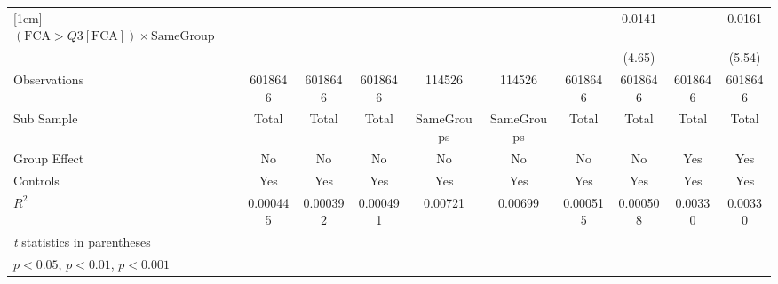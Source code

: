 {\begin{tabular}{l*{9}{c}}
[1em]
 $ (\text{FCA} > Q3[\text{FCA}]) \times  {\text{SameGroup} }  $ &                  &                  &                  &                  &                  &                  &   0.0141\sym{***}&                  &   0.0161\sym{***}\\
                &                  &                  &                  &                  &                  &                  &   (4.65)         &                  &   (5.54)         \\
\hline
Observations    &  6018646         &  6018646         &  6018646         &   114526         &   114526         &  6018646         &  6018646         &  6018646         &  6018646         \\
Sub Sample      &    Total         &    Total         &    Total         &SameGroups         &SameGroups         &    Total         &    Total         &    Total         &    Total         \\
Group Effect    &       No         &       No         &       No         &       No         &       No         &       No         &       No         &      Yes         &      Yes         \\
Controls        &      Yes         &      Yes         &      Yes         &      Yes         &      Yes         &      Yes         &      Yes         &      Yes         &      Yes         \\
$ R^2 $         & 0.000445         & 0.000392         & 0.000491         &  0.00721         &  0.00699         & 0.000515         & 0.000508         &  0.00330         &  0.00330         \\
\hline\hline
\multicolumn{10}{l}{\footnotesize \textit{t} statistics in parentheses}\\
\multicolumn{10}{l}{\footnotesize \sym{*} \(p<0.05\), \sym{**} \(p<0.01\), \sym{***} \(p<0.001\)}\\
\end{tabular}
}
